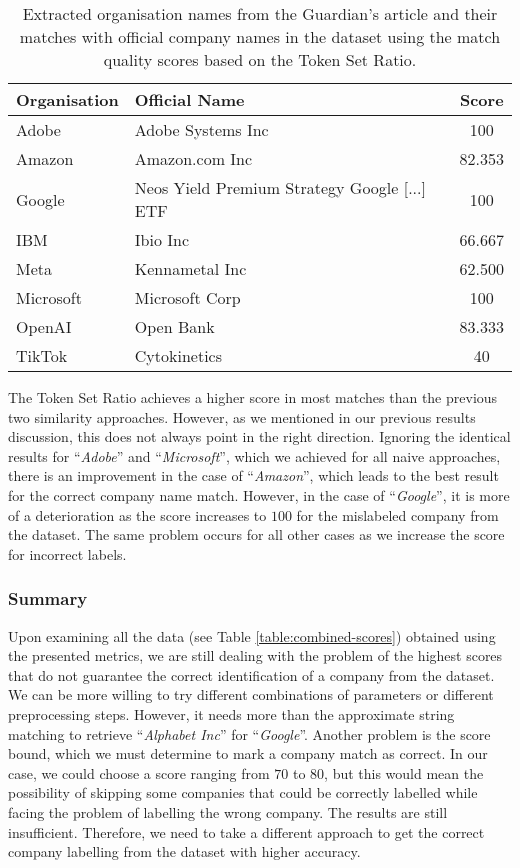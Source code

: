 \begin{table}[ht]
    \centering
    \caption{Extracted organisation names from the Guardian's article and their matches with official company names in the dataset using the match quality scores based on the Token Set Ratio.}
    \label{table:token-set-ratio}
    \begin{tabular}{l l c}
        \hline
        Organisation & Official Name & Score \\
        \hline
        Adobe & Adobe Systems Inc & 100 \\
        Amazon & Amazon.com Inc & 82.353 \\
        Google & Neos Yield Premium Strategy Google [...] ETF & 100 \\
        IBM & Ibio Inc & 66.667 \\
        Meta & Kennametal Inc & 62.500 \\
        Microsoft & Microsoft Corp & 100 \\
        OpenAI & Open Bank & 83.333 \\
        TikTok & Cytokinetics & 40 \\
        \hline
    \end{tabular}
\end{table}

The Token Set Ratio achieves a higher score in most matches than the previous two similarity approaches. However, as we mentioned in our previous results discussion, this does not always point in the right direction. Ignoring the identical results for ``\textit{Adobe}'' and ``\textit{Microsoft}'', which we achieved for all naive approaches, there is an improvement in the case of ``\textit{Amazon}'', which leads to the best result for the correct company name match. However, in the case of ``\textit{Google}'', it is more of a deterioration as the score increases to $100$ for the mislabeled company from the dataset. The same problem occurs for all other cases as we increase the score for incorrect labels.

\subsubsection*{Summary}
\label{subsubsec:naive-approach-summary}
Upon examining all the data (see Table \ref{table:combined-scores}) obtained using the presented metrics, we are still dealing with the problem of the highest scores that do not guarantee the correct identification of a company from the dataset. We can be more willing to try different combinations of parameters or different preprocessing steps. However, it needs more than the approximate string matching to retrieve ``\textit{Alphabet Inc}'' for ``\textit{Google}''. Another problem is the score bound, which we must determine to mark a company match as correct. In our case, we could choose a score ranging from $70$ to $80$, but this would mean the possibility of skipping some companies that could be correctly labelled while facing the problem of labelling the wrong company. The results are still insufficient. Therefore, we need to take a different approach to get the correct company labelling from the dataset with higher accuracy.

